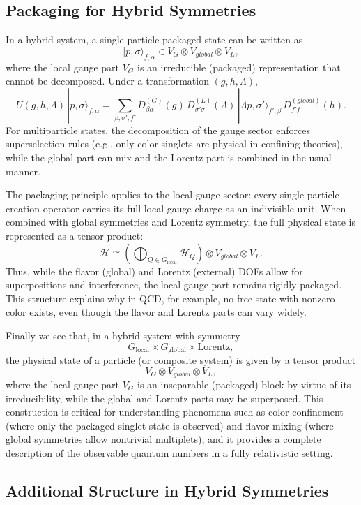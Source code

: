 \documentclass[12pt,a4paper]{article}
\begin{document}
\subsection{Packaging for Hybrid Symmetries}


In a hybrid system, a single-particle packaged state can be written as
\[
|p,\sigma\rangle_{f,\alpha} \in V_{G} \otimes V_{global} \otimes V_{L},
\]
where the local gauge part $V_G$ is an irreducible (packaged) representation that cannot be decomposed.
Under a transformation $(g, h, \Lambda)$,
\[
U(g,h,\Lambda)\,|p,\sigma\rangle_{f,\alpha} = \sum_{\beta, \sigma', f'} D^{(G)}_{\beta\alpha}(g)\, D^{(L)}_{\sigma'\sigma}(\Lambda)\, | \Lambda p, \sigma'\rangle_{f',\beta}\, D^{(global)}_{f'f}(h).
\]
For multiparticle states, the decomposition of the gauge sector enforces superselection rules (e.g., only color singlets are physical in confining theories), while the global part can mix and the Lorentz part is combined in the usual manner.


The packaging principle applies to the local gauge sector:
every single-particle creation operator carries its full local gauge charge as an indivisible unit.
When combined with global symmetries and Lorentz symmetry, the full physical state is represented as a tensor product:
\[
\mathcal{H} \cong \left( \bigoplus_{Q\in\hat{G}_{\mathrm{local}}} \mathcal{H}_Q \right) \otimes V_{global} \otimes V_{L}.
\]
Thus, while the flavor (global) and Lorentz (external) DOFs allow for superpositions and interference, the local gauge part remains rigidly packaged.
This structure explains why in QCD, for example, no free state with nonzero color exists, even though the flavor and Lorentz parts can vary widely.


Finally we see that, in a hybrid system with symmetry
\[
G_{\mathrm{local}} \times G_{\mathrm{global}} \times \mathrm{Lorentz},
\]
the physical state of a particle (or composite system) is given by a tensor product
\[
V_{G} \otimes V_{global} \otimes V_{L},
\]
where the local gauge part $V_G$ is an inseparable (packaged) block by virtue of its irreducibility, while the global and Lorentz parts may be superposed.
This construction is critical for understanding phenomena such as color confinement (where only the packaged singlet state is observed) and flavor mixing (where global symmetries allow nontrivial multiplets), and it provides a complete description of the observable quantum numbers in a fully relativistic setting.



\subsection{Additional Structure in Hybrid Symmetries}
\label{SEC:HybridAdditional}
\end{document}
